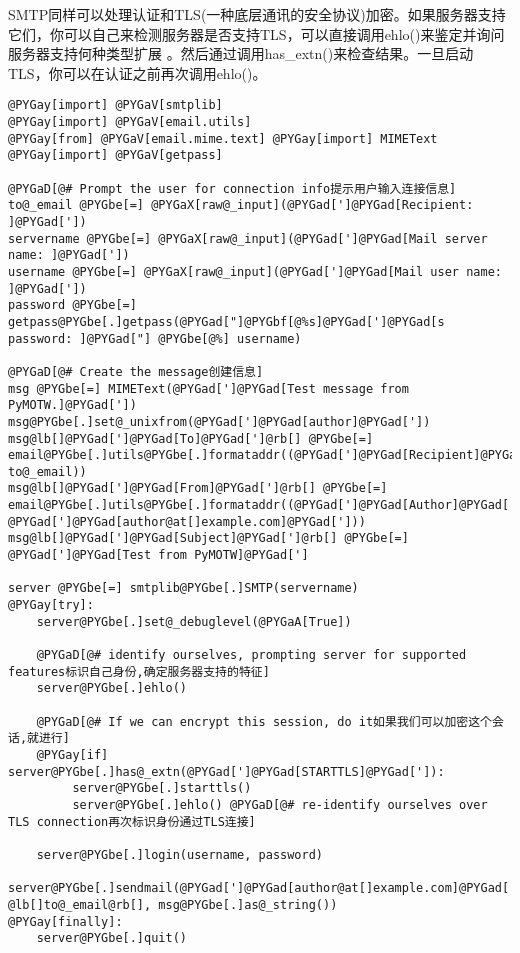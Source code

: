 \documentclass[a4paper,10pt,english]{manual}
\begin{document}
SMTP同样可以处理认证和TLS(一种底层通讯的安全协议)加密。如果服务器支持它们，你可以自己来检测服务器是否支持TLS，可以直接调用ehlo()来鉴定并询问服务器支持何种类型扩展 。然后通过调用has\_extn()来检查结果。一旦启动TLS，你可以在认证之前再次调用ehlo()。

\begin{Verbatim}[commandchars=@\[\]]
@PYGay[import] @PYGaV[smtplib]
@PYGay[import] @PYGaV[email.utils]
@PYGay[from] @PYGaV[email.mime.text] @PYGay[import] MIMEText
@PYGay[import] @PYGaV[getpass]

@PYGaD[@# Prompt the user for connection info提示用户输入连接信息]
to@_email @PYGbe[=] @PYGaX[raw@_input](@PYGad[']@PYGad[Recipient: ]@PYGad['])
servername @PYGbe[=] @PYGaX[raw@_input](@PYGad[']@PYGad[Mail server name: ]@PYGad['])
username @PYGbe[=] @PYGaX[raw@_input](@PYGad[']@PYGad[Mail user name: ]@PYGad['])
password @PYGbe[=] getpass@PYGbe[.]getpass(@PYGad["]@PYGbf[@%s]@PYGad[']@PYGad[s password: ]@PYGad["] @PYGbe[@%] username)

@PYGaD[@# Create the message创建信息]
msg @PYGbe[=] MIMEText(@PYGad[']@PYGad[Test message from PyMOTW.]@PYGad['])
msg@PYGbe[.]set@_unixfrom(@PYGad[']@PYGad[author]@PYGad['])
msg@lb[]@PYGad[']@PYGad[To]@PYGad[']@rb[] @PYGbe[=] email@PYGbe[.]utils@PYGbe[.]formataddr((@PYGad[']@PYGad[Recipient]@PYGad['], to@_email))
msg@lb[]@PYGad[']@PYGad[From]@PYGad[']@rb[] @PYGbe[=] email@PYGbe[.]utils@PYGbe[.]formataddr((@PYGad[']@PYGad[Author]@PYGad['], @PYGad[']@PYGad[author@at[]example.com]@PYGad[']))
msg@lb[]@PYGad[']@PYGad[Subject]@PYGad[']@rb[] @PYGbe[=] @PYGad[']@PYGad[Test from PyMOTW]@PYGad[']

server @PYGbe[=] smtplib@PYGbe[.]SMTP(servername)
@PYGay[try]:
    server@PYGbe[.]set@_debuglevel(@PYGaA[True])

    @PYGaD[@# identify ourselves, prompting server for supported features标识自己身份,确定服务器支持的特征]
    server@PYGbe[.]ehlo()

    @PYGaD[@# If we can encrypt this session, do it如果我们可以加密这个会话,就进行]
    @PYGay[if] server@PYGbe[.]has@_extn(@PYGad[']@PYGad[STARTTLS]@PYGad[']):
         server@PYGbe[.]starttls()
         server@PYGbe[.]ehlo() @PYGaD[@# re-identify ourselves over TLS connection再次标识身份通过TLS连接]

    server@PYGbe[.]login(username, password)
    server@PYGbe[.]sendmail(@PYGad[']@PYGad[author@at[]example.com]@PYGad['], @lb[]to@_email@rb[], msg@PYGbe[.]as@_string())
@PYGay[finally]:
    server@PYGbe[.]quit()
\end{Verbatim}
\end{document}
